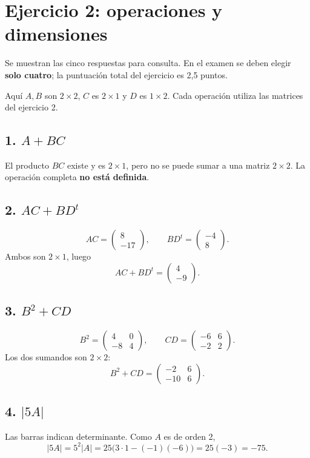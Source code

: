\documentclass[11pt]{article}
\begin{document}
\section*{Ejercicio 2: operaciones y dimensiones}
Se muestran las cinco respuestas para consulta. En el examen se deben elegir \textbf{solo cuatro}; la puntuación total del ejercicio es 2,5 puntos.

Aquí $A,B$ son $2\times2$, $C$ es $2\times1$ y $D$ es $1\times2$. Cada operación utiliza las matrices del ejercicio 2.
\subsection*{1. $A+BC$}
El producto $BC$ existe y es $2\times1$, pero no se puede sumar a una matriz $2\times2$. La operación completa \textbf{no está definida}.
\subsection*{2. $AC+BD^t$}
\[
AC=\begin{pmatrix}8\\-17\end{pmatrix},\qquad BD^t=\begin{pmatrix}-4\\8\end{pmatrix}.
\]
Ambos son $2\times1$, luego
\[\boxed{AC+BD^t=\begin{pmatrix}4\\-9\end{pmatrix}}.\]
\subsection*{3. $B^2+CD$}
\[
B^2=\begin{pmatrix}4&0\\-8&4\end{pmatrix},\qquad
CD=\begin{pmatrix}-6&6\\-2&2\end{pmatrix}.
\]
Los dos sumandos son $2\times2$:
\[\boxed{B^2+CD=\begin{pmatrix}-2&6\\-10&6\end{pmatrix}}.\]
\subsection*{4. $|5A|$}
Las barras indican determinante. Como $A$ es de orden 2,
\[|5A|=5^2|A|=25\bigl(3\cdot1-(-1)(-6)\bigr)=25(-3)=\boxed{-75}.\]
\end{document}
